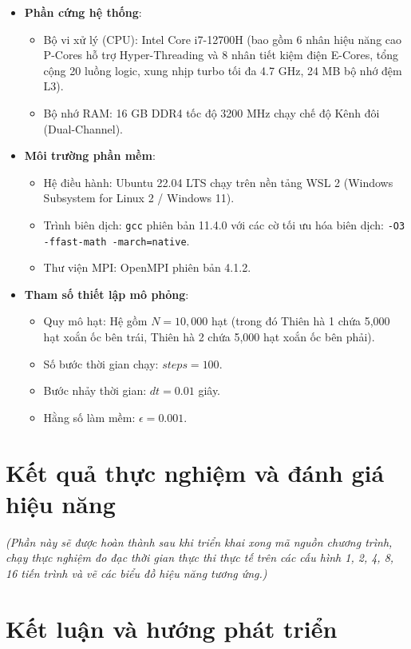 \documentclass[12pt]{article}
\begin{document}
\begin{itemize}
    \item \textbf{Phần cứng hệ thống}:
    \begin{itemize}
        \item Bộ vi xử lý (CPU): Intel Core i7-12700H (bao gồm 6 nhân hiệu năng cao P-Cores hỗ trợ Hyper-Threading và 8 nhân tiết kiệm điện E-Cores, tổng cộng 20 luồng logic, xung nhịp turbo tối đa 4.7 GHz, 24 MB bộ nhớ đệm L3).
        \item Bộ nhớ RAM: 16 GB DDR4 tốc độ 3200 MHz chạy chế độ Kênh đôi (Dual-Channel).
    \end{itemize}
    \item \textbf{Môi trường phần mềm}:
    \begin{itemize}
        \item Hệ điều hành: Ubuntu 22.04 LTS chạy trên nền tảng WSL 2 (Windows Subsystem for Linux 2 / Windows 11).
        \item Trình biên dịch: \texttt{gcc} phiên bản 11.4.0 với các cờ tối ưu hóa biên dịch: \texttt{-O3 -ffast-math -march=native}.
        \item Thư viện MPI: OpenMPI phiên bản 4.1.2.
    \end{itemize}
    \item \textbf{Tham số thiết lập mô phỏng}:
    \begin{itemize}
        \item Quy mô hạt: Hệ gồm $N = 10,000$ hạt (trong đó Thiên hà 1 chứa 5,000 hạt xoắn ốc bên trái, Thiên hà 2 chứa 5,000 hạt xoắn ốc bên phải).
        \item Số bước thời gian chạy: $steps = 100$.
        \item Bước nhảy thời gian: $dt = 0.01$ giây.
        \item Hằng số làm mềm: $\epsilon = 0.001$.
    \end{itemize}
\end{itemize}

\section{Kết quả thực nghiệm và đánh giá hiệu năng}
\label{sec:results}
\textit{(Phần này sẽ được hoàn thành sau khi triển khai xong mã nguồn chương trình, chạy thực nghiệm đo đạc thời gian thực thi thực tế trên các cấu hình 1, 2, 4, 8, 16 tiến trình và vẽ các biểu đồ hiệu năng tương ứng.)}

\section{Kết luận và hướng phát triển}
\label{sec:conclusion}
\end{document}
